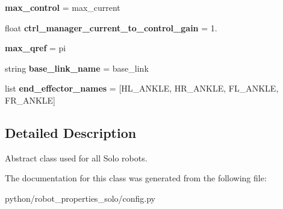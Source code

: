 \begin{DoxyCompactItemize}
\item 
{\bfseries max\+\_\+control} = max\+\_\+current\hypertarget{classrobot__properties__solo_1_1config_1_1SoloAbstract_a02e452cd145fe5ece8b7be238f3cfd25}{}\label{classrobot__properties__solo_1_1config_1_1SoloAbstract_a02e452cd145fe5ece8b7be238f3cfd25}

\item 
float {\bfseries ctrl\+\_\+manager\+\_\+current\+\_\+to\+\_\+control\+\_\+gain} = 1.\hypertarget{classrobot__properties__solo_1_1config_1_1SoloAbstract_ae91d562ea5d55439339d14eaa70abdd7}{}\label{classrobot__properties__solo_1_1config_1_1SoloAbstract_ae91d562ea5d55439339d14eaa70abdd7}

\item 
{\bfseries max\+\_\+qref} = pi\hypertarget{classrobot__properties__solo_1_1config_1_1SoloAbstract_ac55924d17dca3b93df500d07ebee38ef}{}\label{classrobot__properties__solo_1_1config_1_1SoloAbstract_ac55924d17dca3b93df500d07ebee38ef}

\item 
string {\bfseries base\+\_\+link\+\_\+name} = \textquotesingle{}base\+\_\+link\textquotesingle{}\hypertarget{classrobot__properties__solo_1_1config_1_1SoloAbstract_af111d2ba734ca0279bb9e65e201fa0b1}{}\label{classrobot__properties__solo_1_1config_1_1SoloAbstract_af111d2ba734ca0279bb9e65e201fa0b1}

\item 
list {\bfseries end\+\_\+effector\+\_\+names} = \mbox{[}\textquotesingle{}H\+L\+\_\+\+A\+N\+K\+LE\textquotesingle{}, \textquotesingle{}H\+R\+\_\+\+A\+N\+K\+LE\textquotesingle{}, \textquotesingle{}F\+L\+\_\+\+A\+N\+K\+LE\textquotesingle{}, \textquotesingle{}F\+R\+\_\+\+A\+N\+K\+LE\textquotesingle{}\mbox{]}\hypertarget{classrobot__properties__solo_1_1config_1_1SoloAbstract_a71d2087ae0591f8117e70b655fd95833}{}\label{classrobot__properties__solo_1_1config_1_1SoloAbstract_a71d2087ae0591f8117e70b655fd95833}

\end{DoxyCompactItemize}


\subsection{Detailed Description}
Abstract class used for all Solo robots. 



The documentation for this class was generated from the following file\+:\begin{DoxyCompactItemize}
\item 
python/robot\+\_\+properties\+\_\+solo/config.\+py\end{DoxyCompactItemize}
